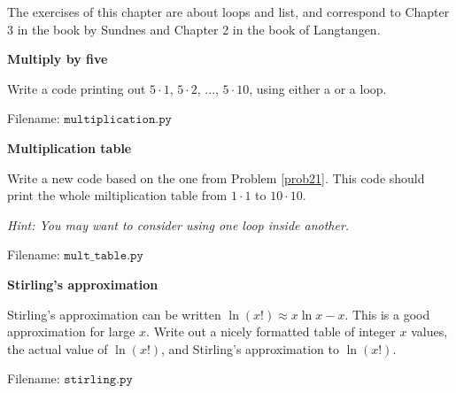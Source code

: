 The exercises of this chapter are about loops and list, and correspond to Chapter
3 in the book by Sundnes and Chapter 2 in the book of Langtangen.


\begin{Problem}{\textbf{Multiply by five}} \label{prob21}

\noindent Write a code printing out $5\cdot 1$, $5\cdot 2$, ..., $5\cdot 10$, using either
a  or a  loop.

Filename: $\texttt{multiplication.py}$
\end{Problem}


\begin{Problem}{\textbf{Multiplication table}}\label{prob22}

\noindent Write a new code based on the one from Problem \ref{prob21}. This code should print the
whole miltiplication table from $1\cdot 1$ to $10 \cdot 10$.

\emph{Hint: You may want to consider using one loop inside another.}

Filename: $\texttt{mult\_table.py}$
\end{Problem}

\begin{Problem}{\textbf{Stirling's approximation}}\label{prob23}

\noindent Stirling's approximation can be written $\ln (x!) \approx x\ln x - x$. This is a
good approximation for large $x$. Write out a nicely formatted table of integer
$x$ values, the actual value of $\ln (x!)$, and Stirling's approximation to $\ln (x!)$.

Filename: $\texttt{stirling.py}$
\end{Problem}


